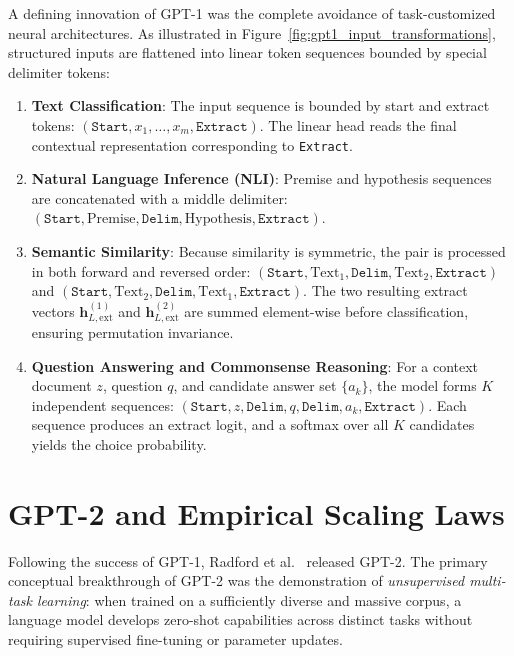 \documentclass[../../../main.tex]{subfiles}
\begin{document}
A defining innovation of GPT-1 was the complete avoidance of task-customized neural architectures. As illustrated in Figure~\ref{fig:gpt1_input_transformations}, structured inputs are flattened into linear token sequences bounded by special delimiter tokens:
\begin{enumerate}
    \item \textbf{Text Classification}: The input sequence is bounded by start and extract tokens: $(\texttt{Start}, x_1, \dots, x_m, \texttt{Extract})$. The linear head reads the final contextual representation corresponding to \texttt{Extract}.
    \item \textbf{Natural Language Inference (NLI)}: Premise and hypothesis sequences are concatenated with a middle delimiter: $(\texttt{Start}, \text{Premise}, \texttt{Delim}, \text{Hypothesis}, \texttt{Extract})$.
    \item \textbf{Semantic Similarity}: Because similarity is symmetric, the pair is processed in both forward and reversed order: $(\texttt{Start}, \text{Text}_1, \texttt{Delim}, \text{Text}_2, \texttt{Extract})$ and $(\texttt{Start}, \text{Text}_2, \texttt{Delim}, \text{Text}_1, \texttt{Extract})$. The two resulting extract vectors $\mathbf{h}_{L, \text{ext}}^{(1)}$ and $\mathbf{h}_{L, \text{ext}}^{(2)}$ are summed element-wise before classification, ensuring permutation invariance.
    \item \textbf{Question Answering and Commonsense Reasoning}: For a context document $z$, question $q$, and candidate answer set $\{a_k\}$, the model forms $K$ independent sequences: $(\texttt{Start}, z, \texttt{Delim}, q, \texttt{Delim}, a_k, \texttt{Extract})$. Each sequence produces an extract logit, and a softmax over all $K$ candidates yields the choice probability.
\end{enumerate}


\section{GPT-2 and Empirical Scaling Laws}
\label{sec:gpt2_scaling_laws}

Following the success of GPT-1, Radford et al.~\cite{radford2019} released GPT-2. The primary conceptual breakthrough of GPT-2 was the demonstration of \emph{unsupervised multi-task learning}: when trained on a sufficiently diverse and massive corpus, a language model develops zero-shot capabilities across distinct tasks without requiring supervised fine-tuning or parameter updates.
\end{document}
